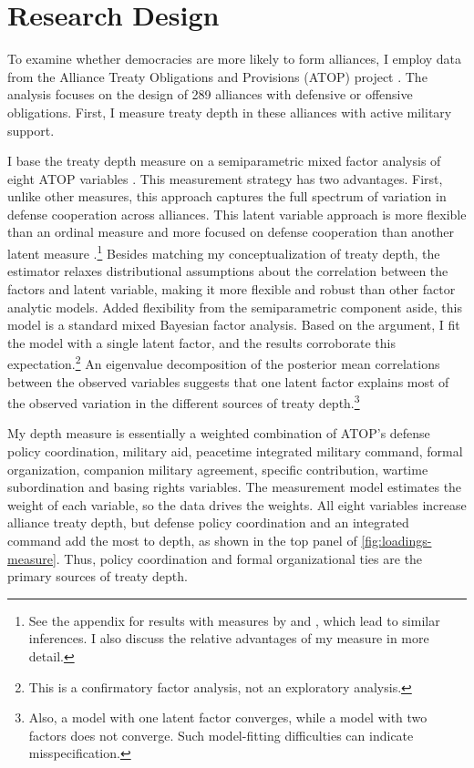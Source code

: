 \documentclass[12pt]{article}
\begin{document}
\section{Research Design}



To examine whether democracies are more likely to form alliances, I employ data from the Alliance Treaty Obligations and Provisions (ATOP) project \citep{Leedsetal2002}. 
The analysis focuses on the design of 289 alliances with defensive or offensive obligations.
First, I measure treaty depth in these alliances with active military support. 


I base the treaty depth measure on a semiparametric mixed factor analysis of eight ATOP variables \citep{Murrayetal2013}.
This measurement strategy has two advantages. 
First, unlike other measures, this approach captures the full spectrum of variation in defense cooperation across alliances.
This latent variable approach is more flexible than an ordinal measure \citep{LeedsAnac2005} and more focused on defense cooperation than another latent measure \citep{BensonClinton2016}.\footnote{See the appendix for results with measures by \citet{LeedsAnac2005} and \citet{BensonClinton2016}, which lead to similar inferences. I also discuss the relative advantages of my measure in more detail.}
Besides matching my conceptualization of treaty depth, the estimator relaxes distributional assumptions about the correlation between the factors and latent variable, making it more flexible and robust than other factor analytic models. 
Added flexibility from the semiparametric component aside, this model is a standard mixed Bayesian factor analysis. 
Based on the argument, I fit the model with a single latent factor, and the results corroborate this expectation.\footnote{This is a confirmatory factor analysis, not an exploratory analysis.}
An eigenvalue decomposition of the posterior mean correlations between the observed variables suggests that one latent factor explains most of the observed variation in the different sources of treaty depth.\footnote{Also, a model with one latent factor converges, while a model with two factors does not converge. Such model-fitting difficulties can indicate misspecification.} 


My depth measure is essentially a weighted combination of ATOP's defense policy coordination, military aid, peacetime integrated military command, formal organization, companion military agreement, specific contribution, wartime subordination and basing rights variables.
The measurement model estimates the weight of each variable, so the data drives the weights.  
All eight variables increase alliance treaty depth, but defense policy coordination and an integrated command add the most to depth, as shown in the top panel of \autoref{fig:loadings-measure}. 
Thus, policy coordination and formal organizational ties are the primary sources of treaty depth. 
\end{document}
